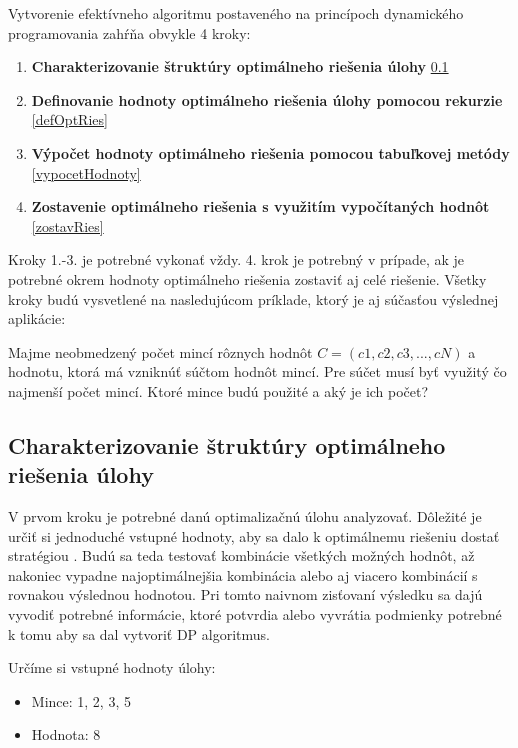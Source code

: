 Vytvorenie efektívneho algoritmu postaveného na princípoch dynamického programovania zahŕňa obvykle 4 kroky:

\begin{enumerate}
    \item \textbf{Charakterizovanie štruktúry optimálneho riešenia úlohy} \ref{charakterStrukt}
    \item \textbf{Definovanie hodnoty optimálneho riešenia úlohy pomocou rekurzie} \ref{defOptRies}
    \item \textbf{Výpočet hodnoty optimálneho riešenia pomocou tabuľkovej metódy} \ref{vypocetHodnoty}
    \item \textbf{Zostavenie optimálneho riešenia s využitím vypočítaných hodnôt} \ref{zostavRies}
\end{enumerate}

Kroky 1.-3. je potrebné vykonať vždy. 4. krok je potrebný v prípade, ak je potrebné okrem hodnoty optimálneho riešenia zostaviť aj celé riešenie. Všetky kroky budú vysvetlené na nasledujúcom príklade, ktorý je aj súčasťou výslednej aplikácie: 

\begin{example}
Majme neobmedzený počet mincí rôznych hodnôt $C=(c1, c2, c3, ..., cN)$ a hodnotu, ktorá má vzniknúť súčtom hodnôt mincí. Pre súčet musí byť využitý čo najmenší počet mincí. Ktoré mince budú použité a aký je ich počet?
\end{example}

\subsection{Charakterizovanie štruktúry optimálneho riešenia úlohy} \label{charakterStrukt}

V prvom kroku je potrebné danú optimalizačnú úlohu analyzovať. Dôležité je určiť si jednoduché vstupné hodnoty, aby sa dalo k optimálnemu riešeniu dostať stratégiou . Budú sa teda testovať kombinácie všetkých možných hodnôt, až nakoniec vypadne najoptimálnejšia kombinácia alebo aj viacero kombinácií s rovnakou výslednou hodnotou. Pri tomto naivnom zisťovaní výsledku sa dajú vyvodiť potrebné informácie, ktoré potvrdia alebo vyvrátia podmienky potrebné k tomu aby sa dal vytvoriť DP algoritmus.

\bigskip 

\noindent Určíme si vstupné hodnoty úlohy: 
\begin{itemize}
    \item Mince: 1, 2, 3, 5
    \item Hodnota: 8
\end{itemize}

